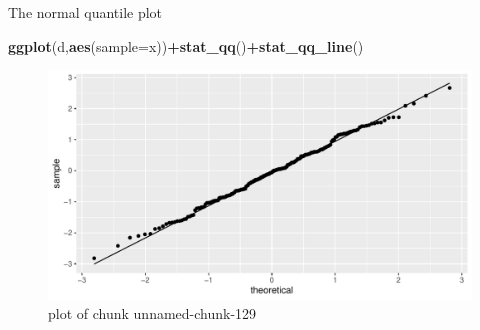 \documentclass[
  ignorenonframetext,
]{beamer}
\newenvironment{Shaded}{\begin{snugshade}}{\end{snugshade}}
\newcommand{\DataTypeTok}[1]{\textcolor[rgb]{0.13,0.29,0.53}{#1}}
\newcommand{\KeywordTok}[1]{\textcolor[rgb]{0.13,0.29,0.53}{\textbf{#1}}}
\newcommand{\NormalTok}[1]{#1}
\newcommand{\OperatorTok}[1]{\textcolor[rgb]{0.81,0.36,0.00}{\textbf{#1}}}
\begin{document}
\begin{frame}[fragile]{The normal quantile plot}
\protect\hypertarget{the-normal-quantile-plot-1}{}

\begin{Shaded}
\begin{Highlighting}[]
\KeywordTok{ggplot}\NormalTok{(d,}\KeywordTok{aes}\NormalTok{(}\DataTypeTok{sample=}\NormalTok{x))}\OperatorTok{+}\KeywordTok{stat_qq}\NormalTok{()}\OperatorTok{+}\KeywordTok{stat_qq_line}\NormalTok{()}
\end{Highlighting}
\end{Shaded}

\begin{figure}
\centering
\includegraphics{figure/unnamed-chunk-129-1.pdf}
\caption{plot of chunk unnamed-chunk-129}
\end{figure}

\end{frame}
\end{document}
